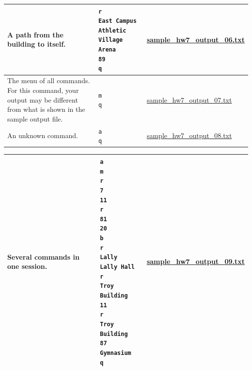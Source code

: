 \documentclass[11pt]{article}
\begin{document}
\begin{center}
\begin{tabular}{ | m{5cm} | m{5cm}| m{5cm} | }
  \hline
  A path from the building to itself. & \texttt{r \newline East Campus Athletic Village Arena \newline 89 \newline q} & \href{https://www.cs.rpi.edu/academics/courses/spring23/csci2600/Documents//sample_hw7_output_06.txt}{sample\_hw7\_output\_06.txt} \\
  \hline
  The menu of all commands. For this command, your output may be different from what is shown in the sample output file. & \texttt{m \newline q} & \href{https://www.cs.rpi.edu/academics/courses/spring23/csci2600/Documents//sample_hw7_output_07.txt}{sample\_hw7\_output\_07.txt} \\
  \hline
  An unknown command. & \texttt{a \newline q} & \href{https://www.cs.rpi.edu/academics/courses/spring23/csci2600/Documents//sample_hw7_output_08.txt}{sample\_hw7\_output\_08.txt} \\
  \hline
  \end{tabular}
  \end{center}

\begin{center}
  \begin{tabular}{ | m{5cm} | m{5cm}| m{5cm} | } 

  \hline
  Several commands in one session. & \texttt{a \newline m \newline r \newline 7 \newline 11 \newline r \newline 81 \newline 20 \newline b \newline r \newline Lally \newline Lally Hall \newline r \newline Troy Building \newline 11 \newline r \newline Troy Building \newline 87 Gymnasium \newline q} & \href{https://www.cs.rpi.edu/academics/courses/spring23/csci2600/Documents//sample_hw7_output_09.txt}{sample\_hw7\_output\_09.txt} \\
  \hline
  \end{tabular}
  \end{center}
\end{document}
